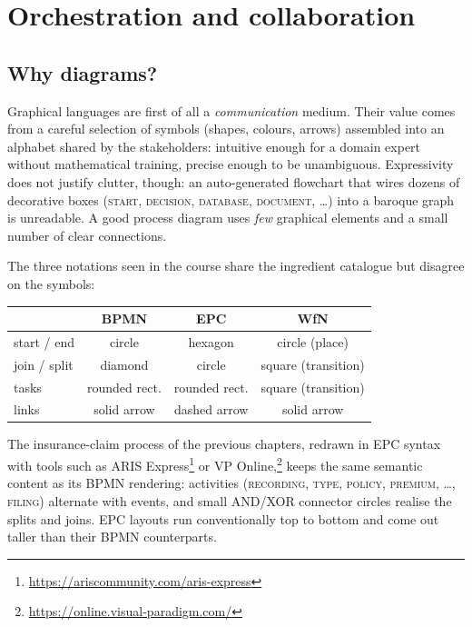 \section{Orchestration and collaboration}

\subsection{Why diagrams?}

Graphical languages are first of all a \emph{communication} medium. Their value comes from a careful selection of symbols (shapes, colours, arrows) assembled into an alphabet shared by the stakeholders: intuitive enough for a domain expert without mathematical training, precise enough to be unambiguous. Expressivity does not justify clutter, though: an auto-generated flowchart that wires dozens of decorative boxes (\textsc{start}, \textsc{decision}, \textsc{database}, \textsc{document}, \dots) into a baroque graph is unreadable. A good process diagram uses \emph{few} graphical elements and a small number of clear connections.

The three notations seen in the course share the ingredient catalogue but disagree on the symbols:
\begin{center}
\begin{tabular}{lccc}
\toprule
 & \textbf{BPMN} & \textbf{EPC} & \textbf{WfN} \\
\midrule
start / end & circle      & hexagon      & circle (place)        \\
join / split & diamond     & circle      & square (transition)    \\
tasks        & rounded rect.& rounded rect.& square (transition)   \\
links        & solid arrow & dashed arrow & solid arrow           \\
\bottomrule
\end{tabular}
\end{center}

The insurance-claim process of the previous chapters, redrawn in EPC syntax with tools such as ARIS Express\footnote{\url{https://ariscommunity.com/aris-express}} or VP Online,\footnote{\url{https://online.visual-paradigm.com/}} keeps the same semantic content as its BPMN rendering: activities (\textsc{recording}, \textsc{type}, \textsc{policy}, \textsc{premium}, \dots, \textsc{filing}) alternate with events, and small AND/XOR connector circles realise the splits and joins. EPC layouts run conventionally top to bottom and come out taller than their BPMN counterparts.

